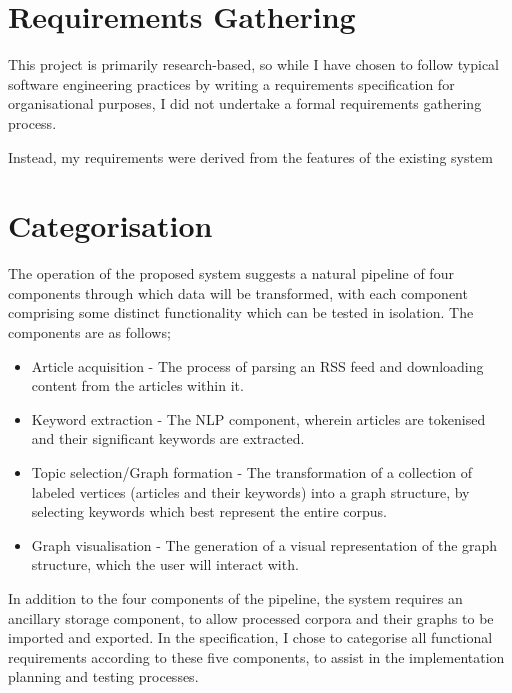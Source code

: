 \section{Requirements Gathering}
This project is primarily research-based, so while I have chosen to follow typical software engineering practices by writing a requirements specification for organisational purposes, I did not undertake a formal requirements gathering process.

Instead, my requirements were derived from the features of the existing system \citep{InformationCartography}


\section{Categorisation}
The operation of the proposed system suggests a natural pipeline of four components through which data will be transformed, with each component comprising some distinct functionality which can be tested in isolation. The components are as follows;
\begin{itemize}
	\item Article acquisition - The process of parsing an RSS feed and downloading content from the articles within it.
	\item Keyword extraction - The NLP component, wherein articles are tokenised and their significant keywords are extracted.
	\item Topic selection/Graph formation - The transformation of a collection of labeled vertices (articles and their keywords) into a graph structure, by selecting keywords which best represent the entire corpus.
	\item Graph visualisation - The generation of a visual representation of the graph structure, which the user will interact with.
\end{itemize}
In addition to the four components of the pipeline, the system requires an ancillary storage component, to allow processed corpora and their graphs to be imported and exported. In the specification, I chose to categorise all functional requirements according to these five components, to assist in the implementation planning and testing processes.

